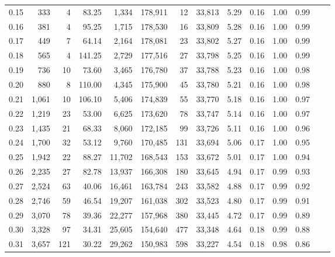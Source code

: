 \begin{tabular}{rrrrrrrrrrrrrr}
0.15 &    333 &      4 &   83.25 &    1,334 &  178,911 &      12 &  33,813 &  5.29 &  0.16 &  1.00 &      0.99 \\
0.16 &    381 &      4 &   95.25 &    1,715 &  178,530 &      16 &  33,809 &  5.28 &  0.16 &  1.00 &      0.99 \\
0.17 &    449 &      7 &   64.14 &    2,164 &  178,081 &      23 &  33,802 &  5.27 &  0.16 &  1.00 &      0.99 \\
0.18 &    565 &      4 &  141.25 &    2,729 &  177,516 &      27 &  33,798 &  5.25 &  0.16 &  1.00 &      0.99 \\
0.19 &    736 &     10 &   73.60 &    3,465 &  176,780 &      37 &  33,788 &  5.23 &  0.16 &  1.00 &      0.98 \\
0.20 &    880 &      8 &  110.00 &    4,345 &  175,900 &      45 &  33,780 &  5.21 &  0.16 &  1.00 &      0.98 \\
0.21 &  1,061 &     10 &  106.10 &    5,406 &  174,839 &      55 &  33,770 &  5.18 &  0.16 &  1.00 &      0.97 \\
0.22 &  1,219 &     23 &   53.00 &    6,625 &  173,620 &      78 &  33,747 &  5.14 &  0.16 &  1.00 &      0.97 \\
0.23 &  1,435 &     21 &   68.33 &    8,060 &  172,185 &      99 &  33,726 &  5.11 &  0.16 &  1.00 &      0.96 \\
0.24 &  1,700 &     32 &   53.12 &    9,760 &  170,485 &     131 &  33,694 &  5.06 &  0.17 &  1.00 &      0.95 \\
0.25 &  1,942 &     22 &   88.27 &   11,702 &  168,543 &     153 &  33,672 &  5.01 &  0.17 &  1.00 &      0.94 \\
0.26 &  2,235 &     27 &   82.78 &   13,937 &  166,308 &     180 &  33,645 &  4.94 &  0.17 &  0.99 &      0.93 \\
0.27 &  2,524 &     63 &   40.06 &   16,461 &  163,784 &     243 &  33,582 &  4.88 &  0.17 &  0.99 &      0.92 \\
0.28 &  2,746 &     59 &   46.54 &   19,207 &  161,038 &     302 &  33,523 &  4.80 &  0.17 &  0.99 &      0.91 \\
0.29 &  3,070 &     78 &   39.36 &   22,277 &  157,968 &     380 &  33,445 &  4.72 &  0.17 &  0.99 &      0.89 \\
0.30 &  3,328 &     97 &   34.31 &   25,605 &  154,640 &     477 &  33,348 &  4.64 &  0.18 &  0.99 &      0.88 \\
0.31 &  3,657 &    121 &   30.22 &   29,262 &  150,983 &     598 &  33,227 &  4.54 &  0.18 &  0.98 &      0.86 \\

\end{tabular}
